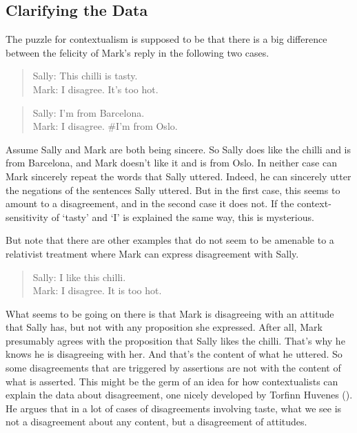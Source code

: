 \documentclass[
  11pt,
  letterpaper,
  DIV=11,
  numbers=noendperiod,
  twoside]{scrartcl}
\begin{document}
\subsection{Clarifying the Data}\label{clarifyingthedata}

The puzzle for contextualism is supposed to be that there is a big
difference between the felicity of Mark's reply in the following two
cases.

\begin{quote}
Sally: This chilli is tasty.\\
Mark: I disagree. It's too hot.
\end{quote}

\begin{quote}
Sally: I'm from Barcelona.\\
Mark: I disagree. \#I'm from Oslo.
\end{quote}

Assume Sally and Mark are both being sincere. So Sally does like the
chilli and is from Barcelona, and Mark doesn't like it and is from Oslo.
In neither case can Mark sincerely repeat the words that Sally uttered.
Indeed, he can sincerely utter the negations of the sentences Sally
uttered. But in the first case, this seems to amount to a disagreement,
and in the second case it does not. If the context-sensitivity of
`tasty' and `I' is explained the same way, this is mysterious.

But note that there are other examples that do not seem to be amenable
to a relativist treatment where Mark can express disagreement with
Sally.

\begin{quote}
Sally: I like this chilli.\\
Mark: I disagree. It is too hot.
\end{quote}

What seems to be going on there is that Mark is disagreeing with an
attitude that Sally has, but not with any proposition she expressed.
After all, Mark presumably agrees with the proposition that Sally likes
the chilli. That's why he knows he is disagreeing with her. And that's
the content of what he uttered. So some disagreements that are triggered
by assertions are not with the content of what is asserted. This might
be the germ of an idea for how contextualists can explain the data about
disagreement, one nicely developed by Torfinn Huvenes
(). He argues that in a lot of cases of
disagreements involving taste, what we see is not a disagreement about
any content, but a disagreement of attitudes.
\end{document}

